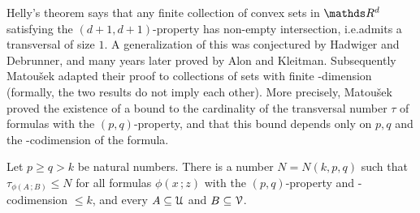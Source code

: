 \documentclass[scombinatorics.tex]{subfiles}
\begin{document}
Helly's theorem says that any finite collection of convex sets in $\RR^d$ satisfying the $(d + 1, d + 1)$-property has non-empty intersection, i.e.\@ admits a transversal of size $1$.
A generalization of this was conjectured by Hadwiger and Debrunner, and many
years later proved by Alon and Kleitman.
Subsequently Matou\v{s}ek adapted their proof to collections of sets with finite \vc-dimension (formally, the two results do not imply each other).
More precisely, Matou\v{s}ek proved the existence of a bound to the cardinality of the transversal number $\tau$ of {\nip} formulas with the $(p,q)$-property, and that this bound depends only on $p,q$ and the \vc-codimension of the formula.

\begin{theorem}
  Let $p\ge q> k$ be natural numbers.
  There is a number $N=N(k,p,q)$ such that 
  $\tau_{\phi(A\,;B)}\le N$ for all formulas $\phi(x\,;z)$ with the $(p,q)$-property and \vc-codimension $\le k$, and every $A\subseteq\EuScript U$ and $B\subseteq\EuScript V$.
\end{theorem}
\end{document}
